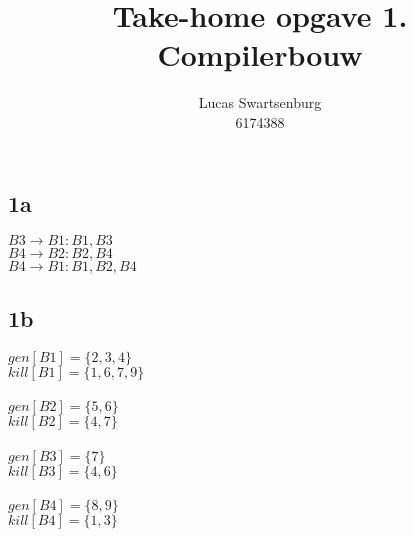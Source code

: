 \documentclass[10pt,a4paper]{article}
\author{Lucas Swartsenburg\\6174388}
\title{Take-home opgave 1. Compilerbouw}
\begin{document}
\maketitle


\subsection*{1a}
$B3 \rightarrow B1:{B1,B3}$ \\
$B4 \rightarrow B2:{B2,B4}$ \\
$B4 \rightarrow B1:{B1,B2,B4}$

\subsection*{1b}
$gen[B1]= \{2,3,4\} $\\
$kill[B1]= \{1,6,7,9\} $\\
\\
$gen[B2]= \{5,6\} $\\
$kill[B2]= \{4,7\} $\\
\\
$gen[B3]= \{7\} $\\
$kill[B3]= \{4,6\} $\\
\\
$gen[B4]= \{8,9\} $\\
$kill[B4]= \{1,3\} $\\
\end{document}
